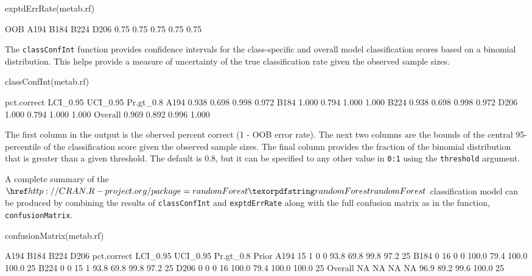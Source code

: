 \begin{Schunk}
\begin{Sinput}
exptdErrRate(metab.rf)
\end{Sinput}
\begin{Soutput}
 OOB A194 B184 B224 D206 
0.75 0.75 0.75 0.75 0.75 
\end{Soutput}
\end{Schunk}

The \texttt{classConfInt} function provides confidence intervals for the
class-specific and overall model classification scores based on a
binomial distribution. This helps provide a measure of uncertainty of
the true classification rate given the observed sample sizes.

\begin{Schunk}
\begin{Sinput}
classConfInt(metab.rf)
\end{Sinput}
\begin{Soutput}
        pct.correct LCI_0.95 UCI_0.95 Pr.gt_0.8
A194          0.938    0.698    0.998     0.972
B184          1.000    0.794    1.000     1.000
B224          0.938    0.698    0.998     0.972
D206          1.000    0.794    1.000     1.000
Overall       0.969    0.892    0.996     1.000
\end{Soutput}
\end{Schunk}

The first column in the output is the oberved percent correct (1 - OOB
error rate). The next two columns are the bounds of the central
95-percentile of the classification score given the observed sample
sizes. The final column provides the fraction of the binomial
distribution that is greater than a given threshold. The default is 0.8,
but it can be specified to any other value in \texttt{0:1} using the
\texttt{threshold} argument.

A complete summary of the \(\CRANpkg{randomForest}\) classification
model can be produced by combining the results of \texttt{classConfInt}
and \texttt{exptdErrRate} along with the full confusion matrix as in the
function, \texttt{confusionMatrix}.

\begin{Schunk}
\begin{Sinput}
confusionMatrix(metab.rf)
\end{Sinput}
\begin{Soutput}
        A194 B184 B224 D206 pct.correct LCI_0.95 UCI_0.95 Pr.gt_0.8 Prior
A194      15    1    0    0        93.8     69.8     99.8      97.2    25
B184       0   16    0    0       100.0     79.4    100.0     100.0    25
B224       0    0   15    1        93.8     69.8     99.8      97.2    25
D206       0    0    0   16       100.0     79.4    100.0     100.0    25
Overall   NA   NA   NA   NA        96.9     89.2     99.6     100.0    25
\end{Soutput}
\end{Schunk}

